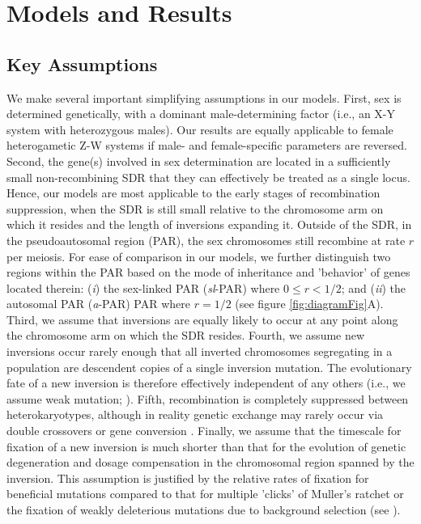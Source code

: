 \documentclass{article}
\begin{document}
\section*{Models and Results} \label{sec:Models}

\subsection*{Key Assumptions} \label{sec:assumptions}
We make several important simplifying assumptions in our models. First, sex is determined genetically, with a dominant male-determining factor (i.e., an X-Y system with heterozygous males). Our results are equally applicable to female heterogametic Z-W systems if male- and female-specific parameters are reversed. Second, the gene(s) involved in sex determination are located in a sufficiently small non-recombining SDR that they can effectively be treated as a single locus. Hence, our models are most applicable to the early stages of recombination suppression, when the SDR is still small relative to the chromosome arm on which it resides and the length of inversions expanding it. Outside of the SDR, in the pseudoautosomal region (PAR), the sex chromosomes still recombine at rate $r$ per meiosis. For ease of comparison in our models, we further distinguish two regions within the PAR based on the mode of inheritance and 'behavior' of genes located therein: ({\itshape i}) the sex-linked PAR ({\itshape sl}-PAR) where $0 \leq r < 1/2$; and ({\itshape ii}) the autosomal PAR ({\itshape a}-PAR) PAR where $r = 1/2$ (see figure \ref{fig:diagramFig}A). Third, we assume that inversions are equally likely to occur at any point along the chromosome arm on which the SDR resides. Fourth, we assume new inversions occur rarely enough that all inverted chromosomes segregating in a population are descendent copies of a single inversion mutation. The evolutionary fate of a new inversion is therefore effectively independent of any others (i.e., we assume weak mutation; \citealt{Gillespie1991}). Fifth, recombination is completely suppressed between heterokaryotypes, although in reality genetic exchange may rarely occur via double crossovers or gene conversion \citep{KrimbasPowell1992, KorunesNoor2019}. Finally, we assume that the timescale for fixation of a new inversion is much shorter than that for the evolution of genetic degeneration and dosage compensation in the chromosomal region spanned by the inversion. This assumption is justified by the relative rates of fixation for beneficial mutations compared to that for multiple 'clicks' of Muller's ratchet or the fixation of weakly deleterious mutations due to background selection (see \citealt{Charlesworth2000, Bachtrog2008}).
\end{document}
